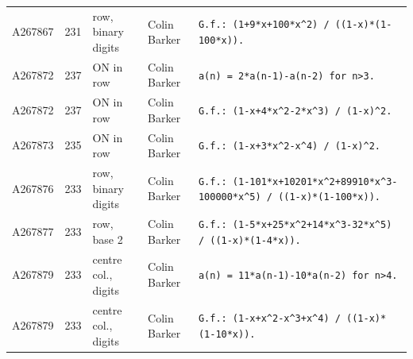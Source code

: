 \documentclass[11pt]{article}
\theoremstyle{definition}
\theoremstyle{remark}
\begin{document}
{\begin{longtable}{p{1.3cm}p{0.7cm}p{2.4cm}p{2.3cm}p{7.3cm}}
A267867 & 231 & row, binary digits & Colin Barker & \texttt{G.f.: \allowbreak{}(1+\allowbreak{}9*\allowbreak{}x+\allowbreak{}100*\allowbreak{}x\^{}2)\allowbreak{} \allowbreak{}/\allowbreak{} \allowbreak{}((1-\allowbreak{}x)\allowbreak{}*\allowbreak{}(1-\allowbreak{}100*\allowbreak{}x)\allowbreak{})\allowbreak{}.} \\
A267872 & 237 & ON in row & Colin Barker & \texttt{a(n)\allowbreak{} \allowbreak{}=\allowbreak{} \allowbreak{}2*\allowbreak{}a(n-\allowbreak{}1)\allowbreak{}-\allowbreak{}a(n-\allowbreak{}2)\allowbreak{} \allowbreak{}for \allowbreak{}n>3.} \\
A267872 & 237 & ON in row & Colin Barker & \texttt{G.f.: \allowbreak{}(1-\allowbreak{}x+\allowbreak{}4*\allowbreak{}x\^{}2-\allowbreak{}2*\allowbreak{}x\^{}3)\allowbreak{} \allowbreak{}/\allowbreak{} \allowbreak{}(1-\allowbreak{}x)\allowbreak{}\^{}2.} \\
A267873 & 235 & ON in row & Colin Barker & \texttt{G.f.: \allowbreak{}(1-\allowbreak{}x+\allowbreak{}3*\allowbreak{}x\^{}2-\allowbreak{}x\^{}4)\allowbreak{} \allowbreak{}/\allowbreak{} \allowbreak{}(1-\allowbreak{}x)\allowbreak{}\^{}2.} \\
A267876 & 233 & row, binary digits & Colin Barker & \texttt{G.f.: \allowbreak{}(1-\allowbreak{}101*\allowbreak{}x+\allowbreak{}10201*\allowbreak{}x\^{}2+\allowbreak{}89910*\allowbreak{}x\^{}3-\allowbreak{}100000*\allowbreak{}x\^{}5)\allowbreak{} \allowbreak{}/\allowbreak{} \allowbreak{}((1-\allowbreak{}x)\allowbreak{}*\allowbreak{}(1-\allowbreak{}100*\allowbreak{}x)\allowbreak{})\allowbreak{}.} \\
A267877 & 233 & row, base 2 & Colin Barker & \texttt{G.f.: \allowbreak{}(1-\allowbreak{}5*\allowbreak{}x+\allowbreak{}25*\allowbreak{}x\^{}2+\allowbreak{}14*\allowbreak{}x\^{}3-\allowbreak{}32*\allowbreak{}x\^{}5)\allowbreak{} \allowbreak{}/\allowbreak{} \allowbreak{}((1-\allowbreak{}x)\allowbreak{}*\allowbreak{}(1-\allowbreak{}4*\allowbreak{}x)\allowbreak{})\allowbreak{}.} \\
A267879 & 233 & centre col., digits & Colin Barker & \texttt{a(n)\allowbreak{} \allowbreak{}=\allowbreak{} \allowbreak{}11*\allowbreak{}a(n-\allowbreak{}1)\allowbreak{}-\allowbreak{}10*\allowbreak{}a(n-\allowbreak{}2)\allowbreak{} \allowbreak{}for \allowbreak{}n>4.} \\
A267879 & 233 & centre col., digits & Colin Barker & \texttt{G.f.: \allowbreak{}(1-\allowbreak{}x+\allowbreak{}x\^{}2-\allowbreak{}x\^{}3+\allowbreak{}x\^{}4)\allowbreak{} \allowbreak{}/\allowbreak{} \allowbreak{}((1-\allowbreak{}x)\allowbreak{}*\allowbreak{}(1-\allowbreak{}10*\allowbreak{}x)\allowbreak{})\allowbreak{}.} \\

\end{longtable}}
\end{document}

